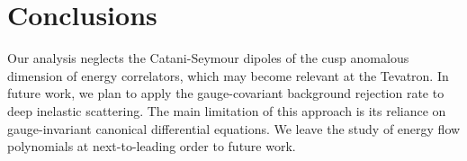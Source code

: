 \section{Conclusions}\label{sec:conclusions}

Our analysis neglects the Catani-Seymour dipoles of the cusp anomalous
dimension of energy correlators, which may become relevant at the
Tevatron. In future work, we plan to apply the gauge-covariant
background rejection rate to deep inelastic scattering. The main
limitation of this approach is its reliance on gauge-invariant canonical
differential equations. We leave the study of energy flow polynomials at
next-to-leading order to future work.

